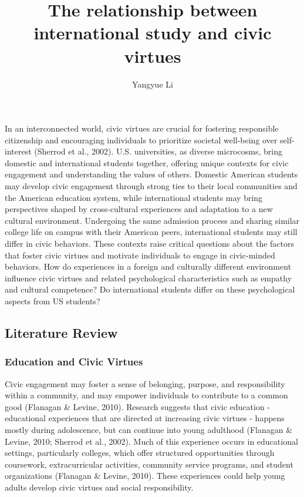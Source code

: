 \documentclass[
  man,
  floatsintext,
  longtable,
  nolmodern,
  notxfonts,
  notimes,
  colorlinks=true,linkcolor=blue,citecolor=blue,urlcolor=blue]{apa7}
\title{The relationship between international study and civic virtues}
\author{Yangyue Li}
\affiliation{
{MA Program in the Social Sciences, University of Chicago}}
\begin{document}
\maketitle


\setcounter{secnumdepth}{-\maxdimen} %

\setlength\LTleft{0pt}


In an interconnected world, civic virtues are crucial for fostering
responsible citizenship and encouraging individuals to prioritize
societal well-being over self-interest (Sherrod et al., 2002). U.S.
universities, as diverse microcosms, bring domestic and international
students together, offering unique contexts for civic engagement and
understanding the values of others. Domestic American students may
develop civic engagement through strong ties to their local communities
and the American education system, while international students may
bring perspectives shaped by cross-cultural experiences and adaptation
to a new cultural environment. Undergoing the same admission process and
sharing similar college life on campus with their American peers,
international students may still differ in civic behaviors. These
contexts raise critical questions about the factors that foster civic
virtues and motivate individuals to engage in civic-minded behaviors.
How do experiences in a foreign and culturally different environment
influence civic virtues and related psychological characteristics such
as empathy and cultural competence? Do international students differ on
these psychological aspects from US students?

\subsection{Literature Review}\label{literature-review}

\subsubsection{Education and Civic
Virtues}\label{education-and-civic-virtues}

Civic engagement may foster a sense of belonging, purpose, and
responsibility within a community, and may empower individuals to
contribute to a common good (Flanagan \& Levine, 2010). Research
suggests that civic education - educational experiences that are
directed at increasing civic virtues - happens mostly during
adolescence, but can continue into young adulthood (Flanagan \& Levine,
2010; Sherrod et al., 2002). Much of this experience occurs in
educational settings, particularly colleges, which offer structured
opportunities through coursework, extracurricular activities, community
service programs, and student organizations (Flanagan \& Levine, 2010).
These experiences could help young adults develop civic virtues and
social responsibility.
\end{document}
